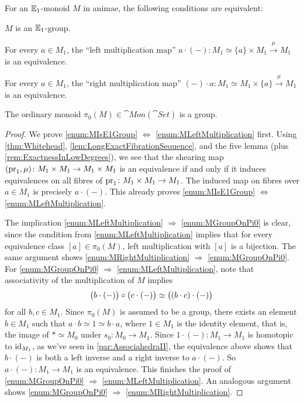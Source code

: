 \begin{lem}\label{lem:E1Groups}
	For an $\mathbb{E}_1$-monoid $M$ in animae, the following conditions are equivalent:
	\begin{alphanumerate}
		\item $M$ is an $\mathbb{E}_1$-group.\label{enum:MIsE1Group}
		\item For every $a\in M_1$, the \enquote{left multiplication map} $a\cdot (-)\colon M_1\simeq \{a\}\times M_1\overset{\mu}{\longrightarrow}M_1$ is an equivalence.\label{enum:MLeftMultiplication}
		\item For every $a\in M_1$, the \enquote{right multiplication map} $(-)\cdot a\colon M_1\simeq M_1\times\{a\}\overset{\mu}{\longrightarrow}M_1$ is an equivalence.\label{enum:MRightMultiplication}
		\item \!The ordinary monoid $\pi_0(M)\in\cat{Mon}(\cat{Set})$ is a group.\label{enum:MGroupOnPi0}
	\end{alphanumerate}
\end{lem}
\begin{proof}
	We prove \cref{enum:MIsE1Group} $\Leftrightarrow$ \cref{enum:MLeftMultiplication} first. Using \cref{thm:Whitehead}, \cref{lem:LongExactFibrationSequence}, and the five lemma (plus \cref{rem:ExactnessInLowDegrees}), we see that the shearing map $(\operatorname{pr}_1,\mu)\colon M_1\times M_1\rightarrow M_1\times M_1$ is an equivalence if and only if it induces equivalences on all fibres of $\operatorname{pr}_1\colon M_1\times M_1\rightarrow M_1$. The induced map on fibres over $a\in M_1$ is precisely $a\cdot (-)$. This already proves \cref{enum:MIsE1Group} $\Leftrightarrow$ \cref{enum:MLeftMultiplication}.
	
	The implication \cref{enum:MLeftMultiplication} $\Rightarrow$ \cref{enum:MGroupOnPi0} is clear, since the condition from \cref{enum:MLeftMultiplication} implies that for every equivalence class $[a]\in\pi_0(M)$, left multiplication with $[a]$ is a bijection. The same argument shows \cref{enum:MRightMultiplication} $\Rightarrow$ \cref{enum:MGroupOnPi0}. For \cref{enum:MGroupOnPi0} $\Rightarrow$ \cref{enum:MLeftMultiplication}, note that associativity of the multiplication of $M$ implies
	\begin{equation*}
		{\lef(b\cdot(-)\righ)}\circ {\,\lef(c\cdot (-)\righ)}\simeq \,\lef((b\cdot c)\cdot (-)\righ) 
	\end{equation*}
	for all $b,c\in M_1$. Since $\pi_0(M)$ is assumed to be a group, there exists an element $b\in M_1$ such that $a\cdot b\simeq 1\simeq b\cdot a$, where $1\in M_1$ is the identity element, that is, the image of $*\simeq M_0$ under $s_0\colon M_0\rightarrow M_1$. Since $1\cdot (-)\colon M_1\rightarrow M_1$ is homotopic to $\operatorname{id}_{M_1}$, as we've seen in \cref{par:AssociahedraII}, the equivalence above shows that $b\cdot (-)$ is both a left inverse and a right inverse to $a\cdot (-)$. So $a\cdot (-)\colon M_1\rightarrow M_1$ is an equivalence. This finishes the proof of \cref{enum:MGroupOnPi0} $\Rightarrow$ \cref{enum:MLeftMultiplication}. An analogous argument shows \cref{enum:MGroupOnPi0} $\Rightarrow$ \cref{enum:MRightMultiplication}.
\end{proof}
